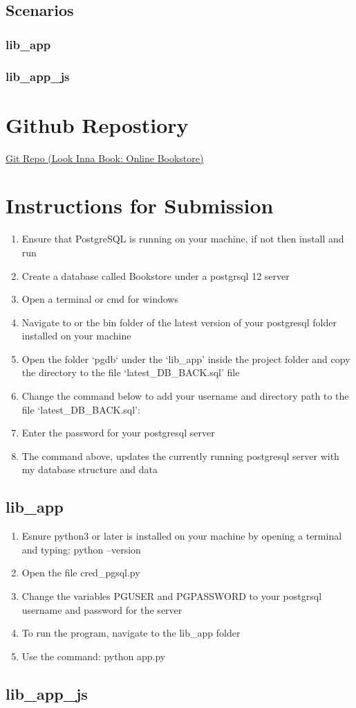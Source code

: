 \documentclass[a4 paper]{article}
\begin{document}
\subsection{Scenarios}
\subsubsection{lib\_app}
\subsubsection{lib\_app\_js}
\section{Github Repostiory}
\href{https://github.com/WalterMitty2112/Online-Bookstore-Webapp}{Git Repo (Look Inna Book: Online Bookstore)}
\section{Instructions for Submission}
\begin{enumerate}
\item Ensure that PostgreSQL is running on your machine, if not then install and run 
\item Create a database called Bookstore under a postgrsql 12 server
\item Open a terminal or cmd for windows
\item Navigate to  or the bin folder of the latest version of your postgresql folder installed on your machine
\item Open the folder `pgdb` under the `lib\_app' inside the project folder and copy the directory to the file `latest\_DB\_BACK.sql' file
\item Change the command below to add your username and directory path to the file `latest\_DB\_BACK.sql': \\
\item Enter the password for your postgresql server
\item The command above, updates the currently running postgresql server with my database structure and data
\end{enumerate}
\subsection{lib\_app}
\begin{enumerate}
\item Esnure python3 or later is installed on your machine by opening a terminal and typing: python --version
\item Open the file cred\_pgsql.py
\item Change the variables PGUSER and PGPASSWORD to your postgrsql username and password for the server
\item To run the program, navigate to the lib\_app folder
\item Use the command: python app.py
\end{enumerate}
\subsection{lib\_app\_js}
\end{document}
